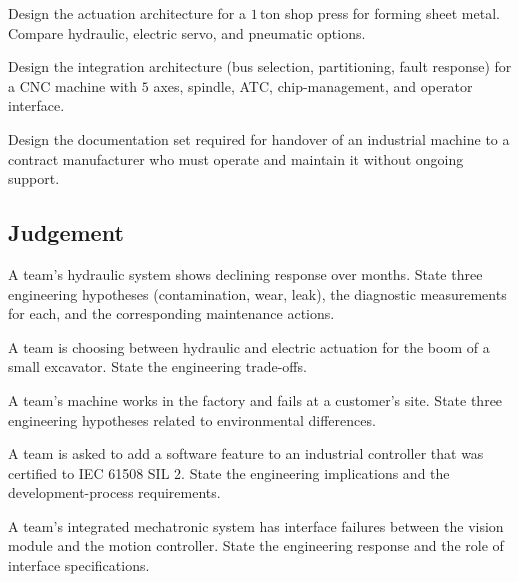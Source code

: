 \begin{exercise}
Design the actuation architecture for a $1\,\text{ton}$ shop press for forming sheet metal. Compare hydraulic, electric servo, and pneumatic options.
\end{exercise}

\begin{exercise}
Design the integration architecture (bus selection, partitioning, fault response) for a CNC machine with $5$ axes, spindle, ATC, chip-management, and operator interface.
\end{exercise}

\begin{exercise}
Design the documentation set required for handover of an industrial machine to a contract manufacturer who must operate and maintain it without ongoing support.
\end{exercise}

\subsection*{Judgement}

\begin{exercise}
A team's hydraulic system shows declining response over months. State three engineering hypotheses (contamination, wear, leak), the diagnostic measurements for each, and the corresponding maintenance actions.
\end{exercise}

\begin{exercise}
A team is choosing between hydraulic and electric actuation for the boom of a small excavator. State the engineering trade-offs.
\end{exercise}

\begin{exercise}
A team's machine works in the factory and fails at a customer's site. State three engineering hypotheses related to environmental differences.
\end{exercise}

\begin{exercise}
A team is asked to add a software feature to an industrial controller that was certified to IEC 61508 SIL 2. State the engineering implications and the development-process requirements.
\end{exercise}

\begin{exercise}
A team's integrated mechatronic system has interface failures between the vision module and the motion controller. State the engineering response and the role of interface specifications.
\end{exercise}

